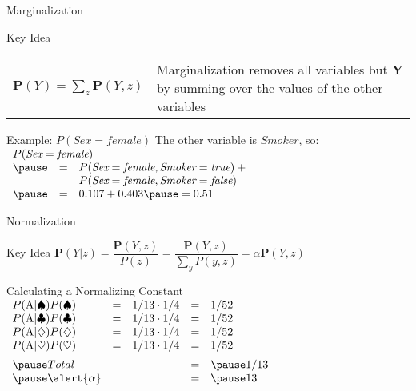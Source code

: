 \documentclass[14pt]{beamer}
\begin{document}
\begin{frame}{Marginalization}
\begin{block}{Key Idea}
\begin{tabular}{lm{}}
$
\mathbf{P}(Y) = \sum\limits_{z}{\mathbf{P}(Y, z)}
$
&
\alert{Marginalization} removes all variables but $\mathbf{Y}$ by summing over the values of the other variables
\end{tabular}
\end{block}
\pause
\begin{block}{Example: $P(\textit{Sex}=\textit{female})$}
The other variable is $\textit{Smoker}$, so: \\[.5em]
$
\begin{array}{lll}
\lefteqn{P(\textit{Sex}=\textit{female})} \\
\pause & = & P(\textit{Sex}=\textit{female},\textit{Smoker}=\textit{true}) + \mbox{}\\
&   & P(\textit{Sex}=\textit{female},\textit{Smoker}=\textit{false})\\
\pause & = & 0.107 + 0.403 \pause = 0.51
\end{array}
$
\end{block}
\end{frame}

\begin{frame}{Normalization}
\begin{block}{Key Idea}
$
\mathbf{P}(Y|z) = \dfrac{\mathbf{P}(Y,z)}{P(z)} = \dfrac{\mathbf{P}(Y,z)}{\sum\limits_{y} P(y, z)} = \alpha\mathbf{P}(Y,z)
$
\end{block}
\pause
\begin{block}{Calculating a Normalizing Constant}
$
\begin{array}{lllll}
P(\mbox{A}|\spadesuit)P(\spadesuit) & = & 1/13 \cdot 1/4 & =  & 1/52 \\
P(\mbox{A}|\clubsuit)P(\clubsuit) & = & 1/13 \cdot 1/4 & =  & 1/52 \\
P(\mbox{A}|\diamondsuit)P(\diamondsuit) & = & 1/13 \cdot 1/4 & =  & 1/52 \\
P(\mbox{A}|\heartsuit)P(\heartsuit) & = & 1/13 \cdot 1/4 & =  & 1/52 \\[.5em]
\pause
Total & & & = & \pause 1/13 \\
\pause
\alert{\alpha} & & & = & \pause 13 \\
\end{array}
$
\end{block}
\end{frame}
\end{document}
